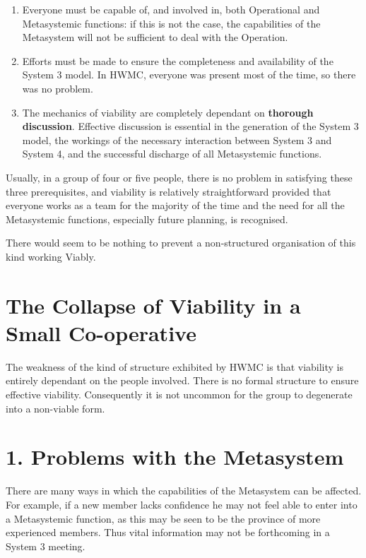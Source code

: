\begin{enumerate}
  \item Everyone must be capable of, and involved in, both Operational and Metasystemic functions: if this is not the case, the capabilities of the Metasystem will not be sufficient to deal with the Operation.

  \item Efforts must be made to ensure the completeness and availability of the System 3 model. In HWMC, everyone was present most of the time, so there was no problem.

  \item The mechanics of viability are completely dependant on \textbf{thorough discussion}. Effective discussion is essential in the generation of the System 3 model, the workings of the necessary interaction between System 3 and System 4, and the successful discharge of all Metasystemic functions.

\end{enumerate}

Usually, in a group of four or five people, there is no problem in satisfying these three prerequisites, and viability is relatively straightforward provided that everyone works as a team for the majority of the time and the need for all the Metasystemic functions, especially future planning, is recognised.

There would seem to be nothing to prevent a non-structured organisation of this kind working Viably.

\section*{The Collapse of Viability in a Small Co-operative}
The weakness of the kind of structure exhibited by HWMC is that viability is entirely dependant on the people involved. There is no formal structure to ensure effective viability. Consequently it is not uncommon for the group to degenerate into a non-viable form.

\section*{1. Problems with the Metasystem}
There are many ways in which the capabilities of the Metasystem can be affected. For example, if a new member lacks confidence he may not feel able to enter into a Metasystemic function, as this may be seen to be the province of more experienced members. Thus vital information may not be forthcoming in a System 3 meeting.

